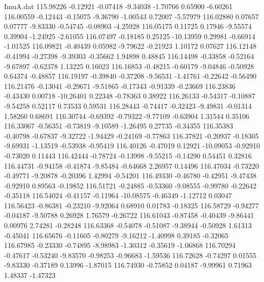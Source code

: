 \begin{filecontents}{ImuA.dat}
 115.98226   -0.12921   -0.07418   -9.34038   -1.70766    0.65900   -6.60261
 116.00559   -0.12443   -0.15075   -9.36790   -1.00543    0.72007   -5.57979
 116.02880    0.07657    0.07777   -9.83330   -0.54745   -0.08903   -4.25928
 116.05175    0.11725    0.17946   -9.55574    0.39904   -1.24925   -2.61055
 116.07497   -0.18185    0.25125  -10.13959    0.29981   -0.66914   -1.01525
 116.09821   -0.40439    0.05982   -9.79622   -0.21923    1.10172    0.07627
 116.12148   -0.41994   -0.27398   -9.39303   -0.35662    1.94898    0.48845
 116.14498   -0.33858   -0.52164   -9.67897   -0.62378    1.13225    0.16023
 116.16853   -0.48215   -0.60179   -9.04846   -0.50928    0.64374   -0.48857
 116.19197   -0.39840   -0.37208   -9.56531   -1.41761   -0.22642   -0.56490
 116.21476   -0.13041   -0.29671   -9.51865   -0.17343   -0.91339   -0.23669
 116.23836   -0.43430    0.00718  -10.26401    0.22348   -0.78363    0.38922
 116.26133   -0.54317   -0.10887   -9.54258    0.52117    0.73533    0.59531
 116.28443   -0.74417   -0.32423   -9.49831   -0.01314    1.58260    0.68691
 116.30744   -0.69392   -0.79322   -9.77109   -0.63904    1.31544    0.35106
 116.33067   -0.56351   -0.73819   -9.10589   -1.26495    0.27735   -0.34355
 116.35383   -0.40798   -0.67837   -9.32722   -1.94429   -0.24169   -0.77863
 116.37821   -0.20937   -0.18305   -9.69931   -1.13519   -0.53938   -0.95419
 116.40126   -0.47019    0.12921  -10.09053   -0.92910   -0.73020    0.11443
 116.42444   -0.78724   -0.13998   -9.55215   -0.14290    0.54451    0.32816
 116.44731   -0.94158   -0.41874   -9.85484   -0.64668    2.26957    0.14496
 116.47034   -0.73220   -0.49771   -9.20878   -0.20396    1.42994   -0.54201
 116.49330   -0.46780   -0.42951   -9.47438   -0.92910    0.89563   -0.19852
 116.51721   -0.24885   -0.53360   -9.08555   -0.99780   -0.22642   -0.35118
 116.54024   -0.41157   -0.11964  -10.08575   -0.46349   -1.12712    0.03047
 116.56423   -0.86381   -0.23210   -9.92064    0.68910    0.01783   -0.18325
 116.58729   -0.94277   -0.04187   -9.50788    0.26928    1.76579   -0.26722
 116.61043   -0.87458   -0.40439   -9.86441    0.00976    2.74281   -0.28248
 116.63368   -0.54078   -0.51087   -9.38944   -0.50928    1.61313   -0.45041
 116.65676   -0.11605   -0.80279   -9.16212   -1.40998    0.39185   -0.32065
 116.67985   -0.23330   -0.74895   -8.98983   -1.30312   -0.35619   -1.06868
 116.70294   -0.47617   -0.53240   -9.83570   -0.98253   -0.96683   -1.59536
 116.72628   -0.74297    0.01555   -9.83330   -0.37189    0.13996   -1.87015
 116.74930   -0.75852    0.04187   -9.99961    0.71963    1.48337   -1.47323

\end{filecontents}
